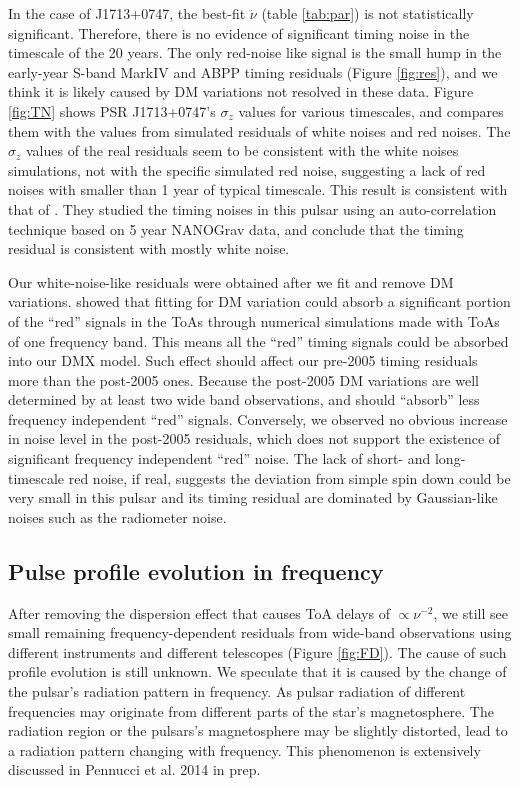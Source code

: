 In the case of J1713+0747, the
best-fit $\ddot{\nu}$ (table \ref{tab:par}) is not statistically significant. 
Therefore, there is no evidence of significant timing noise in the
timescale of the 20 years. The only red-noise like
signal is the small hump in the early-year S-band MarkIV and ABPP timing residuals (Figure
\ref{fig:res}), and we think it is likely caused by DM variations not resolved in
these data. Figure \ref{fig:TN} 
shows PSR J1713+0747's $\sigma_z$ values for various timescales, and compares them
with the values from simulated residuals of white noises and
red noises. The $\sigma_z$ values of the real residuals seem to be consistent 
with the white noises simulations, not with the specific simulated red noise,
suggesting a lack of red noises with smaller than 1 year of typical timescale. 
This result is consistent with that of \citet{pjl+13}. They
studied the timing noises in this pulsar using an auto-correlation technique
based on 5 year NANOGrav data, and conclude that the timing residual is
consistent with mostly white noise.

Our white-noise-like residuals were obtained after we fit and remove
DM variations. \citet{kcs+13} showed that fitting for DM variation could
absorb a significant portion of the ``red'' signals in the ToAs through
numerical simulations made with ToAs of one frequency band. This means
all the ``red'' timing signals could be absorbed into our DMX model.
Such effect should affect our pre-2005 timing
residuals more than the post-2005 ones. Because the post-2005 DM variations 
are well determined by at least two wide band observations, and should
``absorb'' less frequency independent ``red'' signals.
Conversely, we observed no obvious increase in noise level in the post-2005
residuals, which does not support the existence of significant
frequency independent ``red'' noise.
The lack of short- and long-timescale red noise, if real,  suggests the
deviation from simple spin down could be very small in this pulsar and its timing
residual are dominated by Gaussian-like noises such as the radiometer noise.


\subsection{Pulse profile evolution in frequency}
\label{sec:FD}
After removing the dispersion effect that causes ToA delays of $\propto \nu^{-2}$,
 we still see small remaining frequency-dependent residuals from wide-band
observations using
different instruments and different telescopes (Figure \ref{fig:FD}).  
The cause of such profile evolution is still unknown.
We speculate that it is caused by the change of the pulsar's radiation pattern in frequency. As pulsar radiation of different frequencies may originate from
different parts of the star's magnetosphere. 
The radiation region or the pulsars's magnetosphere may be slightly distorted,
lead to a radiation pattern changing with frequency. This phenomenon is extensively discussed in Pennucci et al. 2014 in prep.


